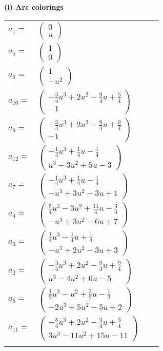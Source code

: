 \documentclass[1p]{elsarticle_modified}
\theoremstyle{definition}
\begin{document}
\flushleft \textbf{(i) Arc colorings}\\
\begin{tabular}{m{7pt} m{180pt} m{7pt} m{180pt} }
\flushright $a_{1}=$&$\begin{pmatrix}0\\u\end{pmatrix}$ \\
\flushright $a_{5}=$&$\begin{pmatrix}1\\0\end{pmatrix}$ \\
\flushright $a_{6}=$&$\begin{pmatrix}1\\- u^2\end{pmatrix}$ \\
\flushright $a_{10}=$&$\begin{pmatrix}-\frac{3}{4} u^3+2 u^2-\frac{9}{4} u+\frac{5}{4}\\-1\end{pmatrix}$ \\
\flushright $a_{9}=$&$\begin{pmatrix}-\frac{3}{4} u^3+2 u^2-\frac{9}{4} u+\frac{9}{4}\\-1\end{pmatrix}$ \\
\flushright $a_{12}=$&$\begin{pmatrix}-\frac{1}{4} u^3+\frac{1}{4} u-\frac{1}{4}\\u^3-3 u^2+5 u-3\end{pmatrix}$ \\
\flushright $a_{7}=$&$\begin{pmatrix}-\frac{1}{4} u^3+\frac{1}{4} u-\frac{1}{4}\\- u^3+3 u^2-3 u+1\end{pmatrix}$ \\
\flushright $a_{4}=$&$\begin{pmatrix}\frac{5}{4} u^3-3 u^2+\frac{11}{4} u-\frac{3}{4}\\- u^3+3 u^2-6 u+7\end{pmatrix}$ \\
\flushright $a_{3}=$&$\begin{pmatrix}\frac{1}{4} u^3-\frac{1}{4} u+\frac{1}{4}\\- u^3+2 u^2-3 u+3\end{pmatrix}$ \\
\flushright $a_{2}=$&$\begin{pmatrix}-\frac{3}{4} u^3+2 u^2-\frac{9}{4} u+\frac{9}{4}\\u^3-4 u^2+6 u-5\end{pmatrix}$ \\
\flushright $a_{8}=$&$\begin{pmatrix}\frac{1}{2} u^3- u^2+\frac{3}{2} u-\frac{1}{2}\\-2 u^3+5 u^2-5 u+2\end{pmatrix}$ \\
\flushright $a_{11}=$&$\begin{pmatrix}-\frac{5}{4} u^3+2 u^2-\frac{3}{4} u+\frac{3}{4}\\3 u^3-11 u^2+15 u-11\end{pmatrix}$\\&\end{tabular}
\end{document}
